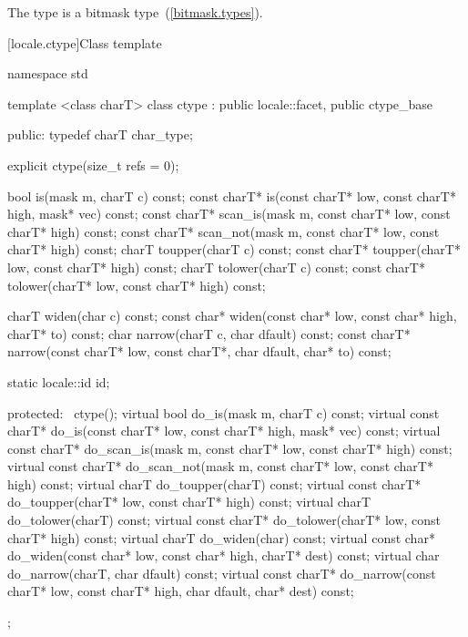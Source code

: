 \pnum
The type
is a bitmask type~(\ref{bitmask.types}).

[locale.ctype]{Class template }

%
\begin{codeblock}
namespace std {
  template <class charT>
  class ctype : public locale::facet, public ctype_base {
  public:
    typedef charT char_type;

    explicit ctype(size_t refs = 0);

    bool         is(mask m, charT c) const;
    const charT* is(const charT* low, const charT* high, mask* vec) const;
    const charT* scan_is(mask m,
                         const charT* low, const charT* high) const;
    const charT* scan_not(mask m,
                          const charT* low, const charT* high) const;
    charT        toupper(charT c) const;
    const charT* toupper(charT* low, const charT* high) const;
    charT        tolower(charT c) const;
    const charT* tolower(charT* low, const charT* high) const;

    charT        widen(char c) const;
    const char*  widen(const char* low, const char* high, charT* to) const;
    char         narrow(charT c, char dfault) const;
    const charT* narrow(const charT* low, const charT*, char dfault,
                        char* to) const;

    static locale::id id;

  protected:
   ~ctype();
    virtual bool         do_is(mask m, charT c) const;
    virtual const charT* do_is(const charT* low, const charT* high,
                               mask* vec) const;
    virtual const charT* do_scan_is(mask m,
                                    const charT* low, const charT* high) const;
    virtual const charT* do_scan_not(mask m,
                                     const charT* low, const charT* high) const;
    virtual charT        do_toupper(charT) const;
    virtual const charT* do_toupper(charT* low, const charT* high) const;
    virtual charT        do_tolower(charT) const;
    virtual const charT* do_tolower(charT* low, const charT* high) const;
    virtual charT        do_widen(char) const;
    virtual const char*  do_widen(const char* low, const char* high,
                                  charT* dest) const;
    virtual char         do_narrow(charT, char dfault) const;
    virtual const charT* do_narrow(const charT* low, const charT* high,
                                   char dfault, char* dest) const;
  };
}
\end{codeblock}

